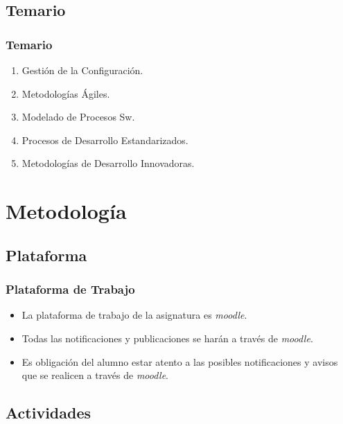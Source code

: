 \documentclass[animated,a4paper,slidestop,xcolor=pst,blue]{beamer}
\begin{document}
\subsection{Temario}

\begin{frame}[c]
	\frametitle{Temario}
	\begin{enumerate}[<+->]
		\item Gestión de la Configuración.
		\item Metodologías Ágiles.
		\item Modelado de Procesos Sw.
		\item Procesos de Desarrollo Estandarizados.
        \item Metodologías de Desarrollo Innovadoras.
	\end{enumerate}
\end{frame}

\section{Metodología}

\subsection{Plataforma}

\begin{frame}[c]
	\frametitle{Plataforma de Trabajo}
	\begin{itemize}
		\item<1-> La plataforma de trabajo de la asignatura es \emph{moodle}.
		\item<2-> Todas las notificaciones y publicaciones se harán a través de \emph{moodle}.
		\item<3-> \alert{Es obligación del alumno estar atento a las posibles notificaciones y avisos que se realicen a través de \emph{moodle}}.
	\end{itemize}
\end{frame}

\subsection{Actividades}
\end{document}
